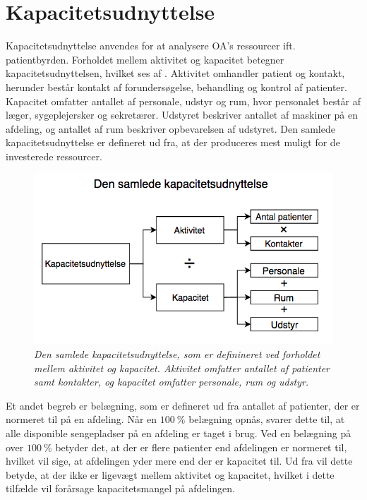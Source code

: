 \clearpage
\section{Kapacitetsudnyttelse} \label{kap}
Kapacitetsudnyttelse anvendes for at analysere OA's ressourcer ift. patientbyrden. Forholdet mellem aktivitet og kapacitet betegner kapacitetsudnyttelsen, hvilket ses af . Aktivitet omhandler patient og kontakt, herunder består kontakt af forundersøgelse, behandling og kontrol af patienter. Kapacitet omfatter antallet af personale, udstyr og rum, hvor personalet består af læger, sygeplejersker og sekretærer. Udstyret beskriver antallet af maskiner på en afdeling, og antallet af rum beskriver opbevarelsen af udstyret. Den samlede kapacitetsudnyttelse er defineret ud fra, at der produceres mest muligt for de investerede ressourcer.\cite{Company2013} 

\begin{figure}[H]
	\centering
	\includegraphics[scale=.5]{figures/Kapacitetsudnyttelse.png}
	\caption{\textit{Den samlede kapacitetsudnyttelse, som er definineret ved forholdet mellem aktivitet og kapacitet. Aktivitet omfatter antallet af patienter samt kontakter, og kapacitet omfatter personale, rum og udstyr.}\cite{Company2013}}
	\label{kapacitet}
\end{figure}

\noindent
Et andet begreb er belægning, som er defineret ud fra antallet af patienter, der er normeret til på en afdeling\cite{Heidmann2014}. Når en $100~\%$ belægning opnås, svarer dette til, at alle disponible sengepladser på en afdeling er taget i brug. Ved en belægning på over $100~\%$ betyder det, at der er flere patienter end afdelingen er normeret til, hvilket vil sige, at afdelingen yder mere end der er kapacitet til. Ud fra  vil dette betyde, at der ikke er ligevægt mellem aktivitet og kapacitet, hvilket i dette tilfælde vil forårsage kapacitetsmangel på afdelingen. 

